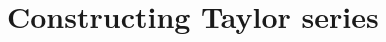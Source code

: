 \documentclass[../book/calcnotes.tex]{subfiles}
\begin{document}
\section{Constructing Taylor series}
\label{sec:taylor-series.const}

\begin{exercises}
\end{exercises}
\end{document}
